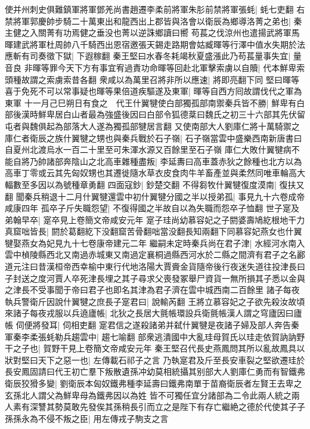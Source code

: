 使并州刺史俱難鎮軍將軍鄧羌尚書趙遷李柔前將軍朱肜前禁將軍張蚝|{
	蚝七吏翻}
右禁將軍郭慶帥步騎二十萬東出和龍西出上郡皆與洛會以衛辰為鄉導洛菁之弟也|{
	秦主健之入關菁有功焉健之垂没也菁以逆誅鄉讀曰嚮}
苟萇之伐涼州也遣揚武將軍馬暉建武將軍杜周帥八千騎西出恩宿邀張天錫走路期會姑臧暉等行澤中值水失期於法應斬有司奏徵下獄|{
	下遐稼翻}
秦王堅曰水春冬耗竭秋夏盛漲此乃苟萇量事失宜|{
	量音良}
非暉等罪今天下方有事宜宥過責功命暉等回赴北軍擊索虜以自贖|{
	代本鮮卑索頭種故謂之索虜索昔各翻}
衆咸以為萬里召將非所以應速|{
	將即亮翻下同}
堅曰暉等喜于免死不可以常事疑也暉等果倍道疾驅遂及東軍|{
	暉等自西方囘故謂伐代之軍為東軍}
十一月己巳朔日有食之　代王什翼犍使白部獨孤部南禦秦兵皆不勝|{
	鮮卑有白部後漢時鮮卑居白山者最為強盛後因曰白部令狐德棻曰魏氏之初三十六部其先伏留屯者與魏俱起為部落大人遂為獨孤部犍居言翻}
又使南部大人劉庫仁將十萬騎禦之庫仁者衛辰之族什翼犍之甥也與秦兵戰於石子嶺|{
	石子嶺當雲中盛樂西南新唐書曰自夏州北渡烏水一百二十里至可朱渾水源又百餘里至石子嶺}
庫仁大敗什翼犍病不能自將乃帥諸部奔陰山之北高車雜種盡叛|{
	李延夀曰高車蓋赤狄之餘種也北方以為高車丁零或云其先匈奴甥也其遷徙隨水草衣皮食肉牛羊畜產並與柔然同唯車輪高大輻數至多因以為號種章勇翻}
四面寇鈔|{
	鈔楚交翻}
不得芻牧什翼犍復度漠南|{
	復扶又翻}
聞秦兵稍退十二月什翼犍還雲中初什翼犍分國之半以授弟孤|{
	事見九十六卷成帝咸康四年}
孤卒子斤失職怨望|{
	不復得國之半故自以為失職而怨卒子恤翻}
世子寔及弟翰早卒|{
	寔卒見上卷簡文帝咸安元年}
寔子珪尚幼慕容妃之子閼婆壽鳩紇根地干力真窟咄皆長|{
	閼於葛翻紇下没翻窟苦骨翻咄當没翻長知兩翻下同慕容妃燕女也什翼犍娶燕女為妃見九十七卷康帝建元二年}
繼嗣未定時秦兵尚在君子津|{
	水經河水南入雲中楨陵縣西北又南過赤城東又南過定襄桐過縣西河水於二縣之間濟有君子之名酈道元注曰昔漢桓帝西幸榆中東行代地洛陽大賈賫金貨隨帝後行夜迷失道往投津長曰子封送之度河賈人卒死津長埋之其子尋求父喪發冢舉尸資貨一無所損其子悉以金與之津長不受事聞于帝曰君子也即名其津為君子濟在雲中城西南二百餘里}
諸子每夜執兵警衛斤因說什翼犍之庶長子寔君曰|{
	說輸芮翻}
王將立慕容妃之子欲先殺汝故頃來諸子每夜戎服以兵遶廬帳|{
	北狄之長居大氈帳環設兵衛氈帳漢人謂之穹廬因曰廬帳}
伺便將發耳|{
	伺相吏翻}
寔君信之遂殺諸弟并弑什翼犍是夜諸子婦及部人奔告秦軍秦李柔張蚝勒兵趨雲中|{
	趨七喻翻}
部衆逃潰國中大亂珪母賀氏以珪走依賀訥訥野干之子也|{
	賀野干見上卷簡文帝咸安元年}
秦王堅召代長史燕鳳問其所以亂故鳳具以狀對堅曰天下之惡一也|{
	左傳載石祁子之言}
乃執寔君及斤至長安車裂之堅欲遷珪於長安鳳固請曰代王初亡羣下叛散遺孫冲幼莫相統攝其别部大人劉庫仁勇而有智鐵弗衛辰狡猾多變|{
	劉衛辰本匈奴鐵弗種李延壽曰鐵弗南單于苗裔衛辰者左賢王去卑之玄孫北人謂父為鮮卑母為鐵弗因以為姓}
皆不可獨任宜分諸部為二令此兩人統之兩人素有深讐其勢莫敢先發俟其孫稍長引而立之是陛下有存亡繼絶之德於代使其子子孫孫永為不侵不叛之臣|{
	用左傳戎子駒支之言}
